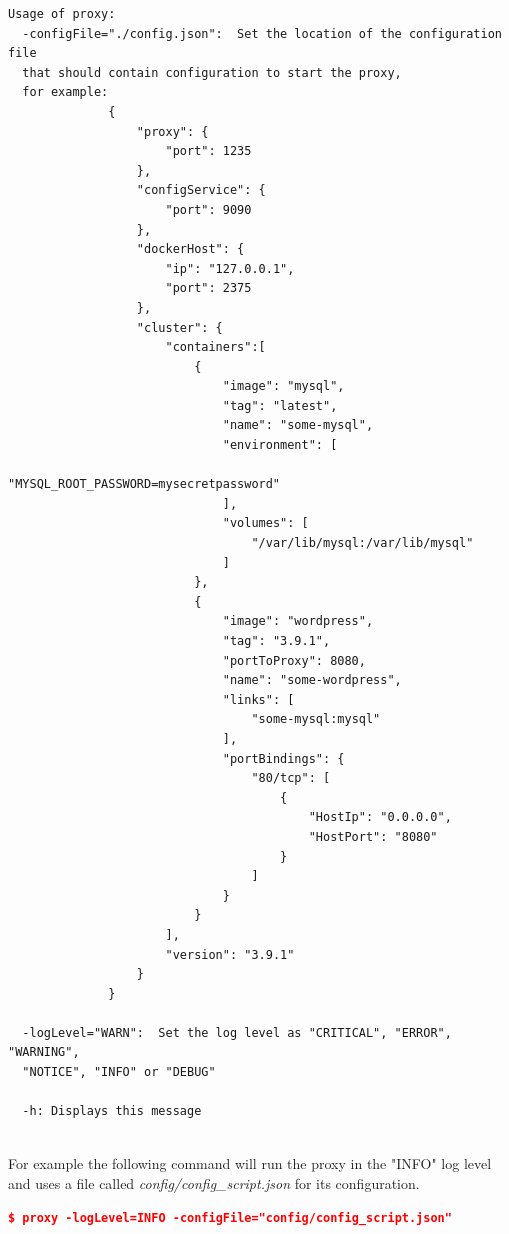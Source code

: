 \documentclass[a4paper,11pt,twoside]{report}
\begin{document}
\begin{lstlisting}[language=terminal]
Usage of proxy:
  -configFile="./config.json":  Set the location of the configuration file 
  that should contain configuration to start the proxy, 
  for example:
              {
                  "proxy": {
                      "port": 1235
                  },
                  "configService": {
                      "port": 9090
                  },
                  "dockerHost": {
                      "ip": "127.0.0.1",
                      "port": 2375
                  },
                  "cluster": {
                      "containers":[
                          {
                              "image": "mysql",
                              "tag": "latest",
                              "name": "some-mysql",
                              "environment": [
                                  "MYSQL_ROOT_PASSWORD=mysecretpassword"
                              ],
                              "volumes": [
                                  "/var/lib/mysql:/var/lib/mysql"
                              ]
                          },
                          {
                              "image": "wordpress",
                              "tag": "3.9.1",
                              "portToProxy": 8080,
                              "name": "some-wordpress",
                              "links": [
                                  "some-mysql:mysql"
                              ],
                              "portBindings": {
                                  "80/tcp": [
                                      {
                                          "HostIp": "0.0.0.0",
                                          "HostPort": "8080"
                                      }
                                  ]
                              }
                          }
                      ],
                      "version": "3.9.1"
                  }
              }

  -logLevel="WARN":  Set the log level as "CRITICAL", "ERROR", "WARNING", 
  "NOTICE", "INFO" or "DEBUG"

  -h: Displays this message
\end{lstlisting} 

\noindent\\
For example the following command will run the proxy in the "INFO" log level and uses a file called \textit{config/config\_script.json} for its configuration. 

\begin{lstlisting}[language=json]
$ proxy -logLevel=INFO -configFile="config/config_script.json" 
\end{lstlisting}
 
\end{document}
